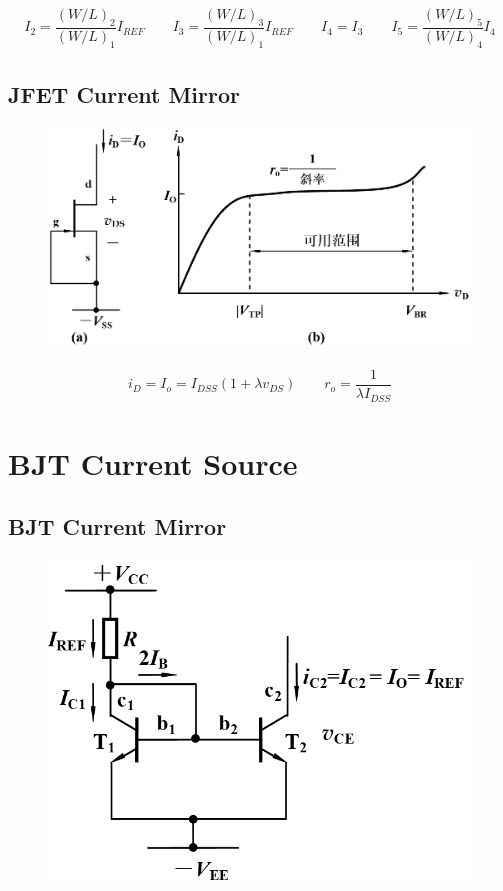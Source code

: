 \begin{equation*}
  \begin{aligned}
    I_2 = \dfrac{\left( W / L \right)_2}{\left( W / L \right)_1} I_{REF} \quad\quad 
    I_3 = \dfrac{\left( W / L \right)_3}{\left( W / L \right)_1} I_{REF} \quad\quad 
    I_4 = I_3 \quad\quad 
    I_5 = \dfrac{\left( W / L \right)_5}{\left( W / L \right)_4} I_4
  \end{aligned}
\end{equation*}

\subsection{JFET Current Mirror}

\begin{figure}[H]
  \centering
  \includegraphics[width=0.9\linewidth]{figures/JFET-Current-Source}
\end{figure}

\begin{equation*}
  \begin{aligned}
    i_D = I_o = I_{DSS} \left( 1 + \lambda v_{DS} \right) \quad\quad 
    r_o = \dfrac{1}{\lambda I_{DSS}} 
  \end{aligned}
\end{equation*}

\section{BJT Current Source}

\subsection{BJT Current Mirror}

\begin{figure}[H]
  \centering
  \includegraphics[width=0.7\linewidth]{figures/BJT-Current-Source}
\end{figure}

